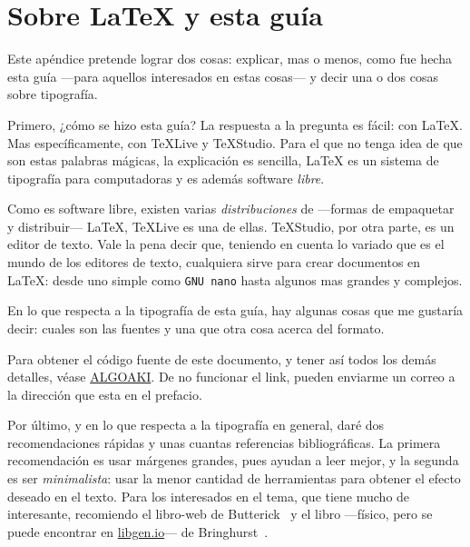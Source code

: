 %
\chapter{Sobre \LaTeX{} y esta guía}
{\noindent Este apéndice pretende lograr dos cosas: explicar, mas o menos, como fue hecha esta guía ---para aquellos interesados en estas cosas--- y decir una o dos cosas sobre tipografía.}

Primero, ¿cómo se hizo esta guía? La respuesta a la pregunta es fácil: con \LaTeX. Mas específicamente, con \TeX Live y \TeX Studio. Para el que no tenga idea de que son estas palabras mágicas, la explicación es sencilla, \LaTeX{} es un sistema de tipografía para computadoras y es además software \textit{libre}. 

%
Como es software libre, existen varias \textit{distribuciones} de ---for\-mas de empaquetar y distribuir--- \LaTeX , \TeX Live es una de ellas. \TeX Studio, por otra parte, es un editor de texto. Vale la pena decir que, teniendo en cuenta lo variado que es el mundo de los editores de texto, cualquiera sirve para crear documentos en \LaTeX : desde uno simple como \texttt{GNU nano} hasta algunos mas grandes y complejos. 

En lo que respecta a la tipografía de esta guía, hay algunas cosas que me gustaría decir: cuales son las fuentes y una que otra cosa acerca del formato.

Para obtener el código fuente de este documento, y tener así todos los demás detalles, véase \url{ALGOAKI}. De no funcionar el link, pueden enviarme un correo a la dirección que esta en el prefacio. 

Por último, y en lo que respecta a la tipografía en general, daré dos recomendaciones rápidas y unas cuantas referencias bibliográficas. La primera recomendación es usar márgenes grandes, pues ayudan a leer mejor, y la segunda es ser \textit{minimalista}: usar la menor cantidad de herramientas para obtener el efecto deseado en el texto. Para los interesados en el tema, que tiene mucho de interesante, recomiendo el libro-web de Butterick~\cite{typobutterick} y el libro ---físico, pero se puede encontrar en \url{libgen.io}--- de Bringhurst~\cite{typobringhurst}.
